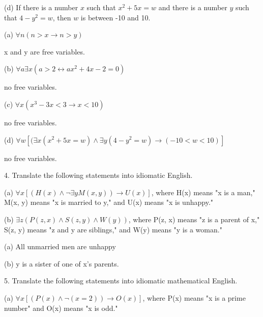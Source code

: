 \documentclass{article}
\begin{document}
\hspace{12pt}(d) If there is a number $x$ such that $x^2 + 5x = w$ and there is a number $y$
such that $4 - y^2 = w$, then $w$ is between -10 and 10.
\vspace{30pt}

(a) $\forall n (n > x \to n > y)$

x and y are free variables.

\vspace{20pt}

(b) $\forall a \exists x (a > 2 \leftrightarrow ax^2 + 4x - 2 = 0)$

no free variables.

\vspace{20pt}

(c) $\forall x (x^3 - 3x < 3 \to x < 10)$

no free variables.

\vspace{20pt}

(d) $\forall w [(\exists x (x^2 + 5x = w) \land \exists y (4 - y^2 = w) \to (-10 < w < 10)]$

no free variables.

\vspace{30pt}

4. Translate the following statements into idiomatic English.

\hspace{12pt}(a) $\forall x[(H(x) \land \neg \exists y M(x, y)) \to U(x)]$, where H(x) means "x is a man,"
M(x, y) means "x is married to y," and U(x) means "x is unhappy."

\hspace{12pt}(b) $\exists z(P(z, x) \land S(z, y) \land W(y))$, where P(z, x) means "z is a parent of
x," S(z, y)  means "z and y are siblings," and W(y) means "y is a
woman."
\vspace{30pt}

(a) All unmarried men are unhappy
\vspace{20pt}

(b) y is a sister of one of x's parents.

\vspace{30pt}

5. Translate the following statements into idiomatic mathematical English.

\hspace{12pt}(a) $\forall x[(P(x) \land \neg (x = 2)) \to O(x)]$, where P(x) means "x is a prime
number" and O(x) means "x is odd."
\end{document}
